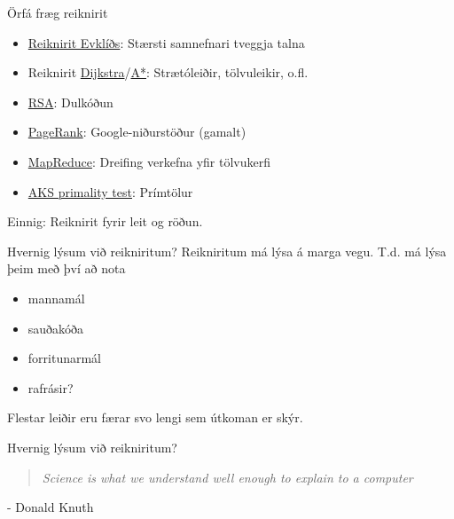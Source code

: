 \documentclass{beamer}
\begin{document}
\begin{frame}{Örfá fræg reiknirit}

\begin{itemize}
 \item \href{http://en.wikipedia.org/wiki/Euclidean_algorithm}{Reiknirit Evklíðs}: Stærsti samnefnari tveggja talna
 \item Reiknirit \href{http://en.wikipedia.org/wiki/Dijkstra\%27s\_algorithm}{Dijkstra}/\href{http://en.wikipedia.org/wiki/A*\_search_algorithm}{A*}: Strætóleiðir, tölvuleikir, o.fl.
 \item \href{http://en.wikipedia.org/wiki/RSA\_(algorithm)}{RSA}: Dulkóðun
 \item \href{http://en.wikipedia.org/wiki/PageRank}{PageRank}: Google-niðurstöður (gamalt)
 \item \href{http://en.wikipedia.org/wiki/MapReduce}{MapReduce}: Dreifing verkefna yfir tölvukerfi
 \item \href{http://en.wikipedia.org/wiki/AKS\_primality\_test}{AKS primality test}: Prímtölur
\end{itemize}
Einnig: Reiknirit fyrir leit og röðun.
\end{frame}


\begin{frame}{Hvernig lýsum við reikniritum?}
Reikniritum má lýsa á marga vegu. T.d. má lýsa þeim með því að nota
\begin{itemize}
 \item mannamál
 \item sauðakóða
 \item forritunarmál
 \item rafrásir?
\end{itemize}
Flestar leiðir eru færar svo lengi sem útkoman er skýr.
\end{frame}

\begin{frame}{Hvernig lýsum við reikniritum?}
\begin{quote}
\emph{Science is what we understand well enough to explain to a computer}
\end{quote} - Donald Knuth
\end{frame}
\end{document}
